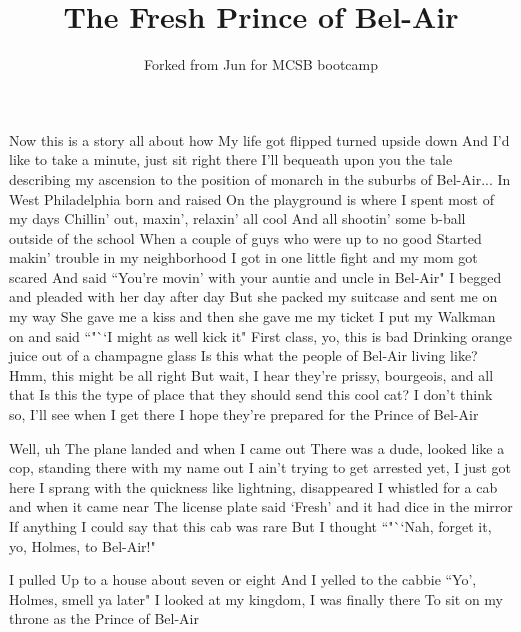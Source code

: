 \documentclass{article}
\title{The Fresh Prince of Bel-Air}
\author{Forked from Jun for MCSB bootcamp}
\begin{document}
\maketitle

Now this is a story all about how
My life got flipped turned upside down
And I'd like to take a minute, just sit right there
I'll bequeath upon you the tale describing my ascension to the position of monarch in the suburbs of Bel-Air...
In West Philadelphia born and raised
On the playground is where I spent most of my days
Chillin' out, maxin', relaxin' all cool
And all shootin' some b-ball outside of the school
When a couple of guys who were up to no good
Started makin' trouble in my neighborhood
I got in one little fight and my mom got scared
And said ``You're movin' with your auntie and uncle in Bel-Air"
I begged and pleaded with her day after day
But she packed my suitcase and sent me on my way
She gave me a kiss and then she gave me my ticket
I put my Walkman on and said ``"``I might as well kick it"
First class, yo, this is bad
Drinking orange juice out of a champagne glass
Is this what the people of Bel-Air living like?
Hmm, this might be all right
But wait, I hear they're prissy, bourgeois, and all that
Is this the type of place that they should send this cool cat?
I don't think so, I'll see when I get there
I hope they're prepared for the Prince of Bel-Air

Well, uh
The plane landed and when I came out
There was a dude, looked like a cop, standing there with my name out
I ain't trying to get arrested yet, I just got here
I sprang with the quickness like lightning, disappeared
I whistled for a cab and when it came near
The license plate said `Fresh' and it had dice in the mirror
If anything I could say that this cab was rare
But I thought ``"``Nah, forget it, yo, Holmes, to Bel-Air!"

I pulled
Up to a house about seven or eight
And I yelled to the cabbie ``Yo', Holmes, smell ya later"
I looked at my kingdom, I was finally there
To sit on my throne as the Prince of Bel-Air
\end{document}
